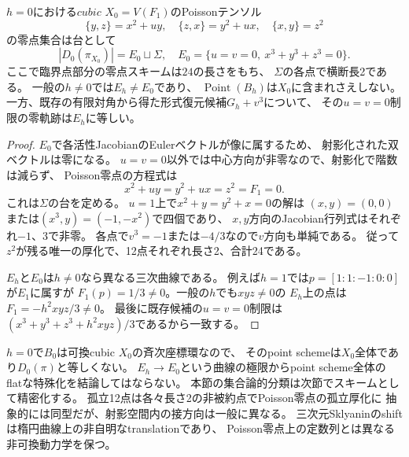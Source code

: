 \begin{proposition}[Poisson零点との比較]\label{prop:psp-comparison}
$h=0$における$cubic$ $X_0=V(F_1)$のPoissonテンソル
\[
\{y,z\}=x^2+uy,\quad\{z,x\}=y^2+ux,\quad\{x,y\}=z^2
\]
の零点集合は台として
\[
|D_0(\pi_{X_0})|=E_0\sqcup\Sigma,
\quad E_0=\{u=v=0,\ x^3+y^3+z^3=0\}.
\tag{PSP2}\label{eq:psp-poisson}
\]
ここで臨界点部分の零点スキームは$24$の長さをもち、
$\Sigma$の各点で横断長2である。
一般の$h\ne0$では$E_h\ne E_0$であり、
$\operatorname{Point}(B_h)$は$X_0$に含まれさえしない。
一方、既存の有限対角から得た形式復元候補$G_h+v^3$について、
その$u=v=0$制限の零軌跡は$E_h$に等しい。
\end{proposition}
\begin{proof}
$E_0$で各活性JacobianのEulerベクトルが像に属するため、
射影化された双ベクトルは零になる。
$u=v=0$以外では中心方向が非零なので、射影化で階数は減らず、
Poisson零点の方程式は
\[
x^2+uy=y^2+ux=z^2=F_1=0.
\]
これは$\Sigma$の台を定める。
$u=1$上で$x^2+y=y^2+x=0$の解は
$(x,y)=(0,0)$または$(x^3,y)=(-1,-x^2)$で四個であり、
$x,y$方向のJacobian行列式はそれぞれ$-1$、$3$で非零。
各点で$v^3=-1$または$-4/3$なので$v$方向も単純である。
従って$z^2$が残る唯一の厚化で、12点それぞれ長さ2、合計24である。

$E_h$と$E_0$は$h\ne0$なら異なる三次曲線である。
例えば$h=1$では$p=[1:1:-1:0:0]$が$E_1$に属すが
$F_1(p)=1/3\ne0$。一般の$h$でも$xyz\ne0$の
$E_h$上の点は$F_1=-h^2xyz/3\ne0$。
最後に既存候補の$u=v=0$制限は
$(x^3+y^3+z^3+h^2xyz)/3$であるから一致する。
\end{proof}

\begin{remark}[埋め込みとスキーム論的分類]
$h=0$で$B_0$は可換cubic $X_0$の斉次座標環なので、
そのpoint schemeは$X_0$全体であり$D_0(\pi)$と等しくない。
$E_h\to E_0$という曲線の極限からpoint scheme全体の
flatな特殊化を結論してはならない。
本節の集合論的分類は次節でスキームとして精密化する。
孤立12点は各々長さ2の非被約点でPoisson零点の孤立厚化に
抽象的には同型だが、射影空間内の接方向は一般に異なる。
三次元Sklyaninのshiftは楕円曲線上の非自明なtranslationであり、
Poisson零点上の定数列とは異なる非可換動力学を保つ。
\end{remark}

